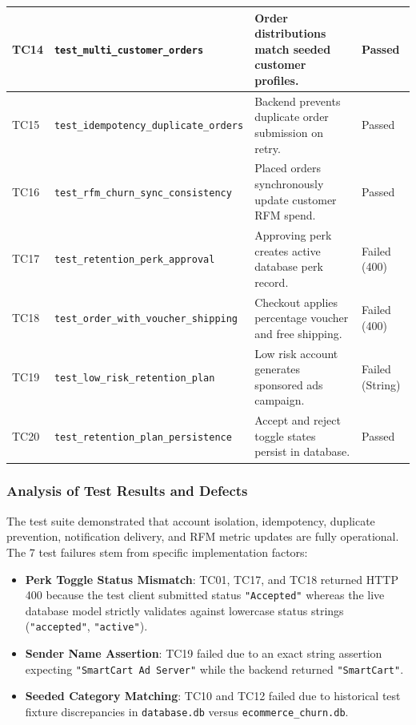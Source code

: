\documentclass[12pt,a4paper]{article}
\begin{document}
\begin{table}[H]
\begin{tabularx}{\linewidth}{|C{1.2cm}|L{4.2cm}|Y|C{1.8cm}|}
TC14 & \texttt{test\_multi\_customer\_orders} & Order distributions match seeded customer profiles. & Passed \\ \hline
TC15 & \texttt{test\_idempotency\_duplicate\_orders} & Backend prevents duplicate order submission on retry. & Passed \\ \hline
TC16 & \texttt{test\_rfm\_churn\_sync\_consistency} & Placed orders synchronously update customer RFM spend. & Passed \\ \hline
TC17 & \texttt{test\_retention\_perk\_approval} & Approving perk creates active database perk record. & Failed (400) \\ \hline
TC18 & \texttt{test\_order\_with\_voucher\_shipping} & Checkout applies percentage voucher and free shipping. & Failed (400) \\ \hline
TC19 & \texttt{test\_low\_risk\_retention\_plan} & Low risk account generates sponsored ads campaign. & Failed (String) \\ \hline
TC20 & \texttt{test\_retention\_plan\_persistence} & Accept and reject toggle states persist in database. & Passed \\ \hline
\end{tabularx}
\label{tab:test_cases}
\end{table}

\subsubsection{Analysis of Test Results and Defects}
The test suite demonstrated that account isolation, idempotency, duplicate prevention, notification delivery, and RFM metric updates are fully operational. The 7 test failures stem from specific implementation factors:
\begin{itemize}[leftmargin=20pt]
    \item \textbf{Perk Toggle Status Mismatch}: TC01, TC17, and TC18 returned HTTP 400 because the test client submitted status \texttt{"Accepted"} whereas the live database model strictly validates against lowercase status strings (\texttt{"accepted"}, \texttt{"active"}).
    \item \textbf{Sender Name Assertion}: TC19 failed due to an exact string assertion expecting \texttt{"SmartCart Ad Server"} while the backend returned \texttt{"SmartCart"}.
    \item \textbf{Seeded Category Matching}: TC10 and TC12 failed due to historical test fixture discrepancies in \texttt{database.db} versus \texttt{ecommerce\_churn.db}.
\end{itemize}
\end{document}
